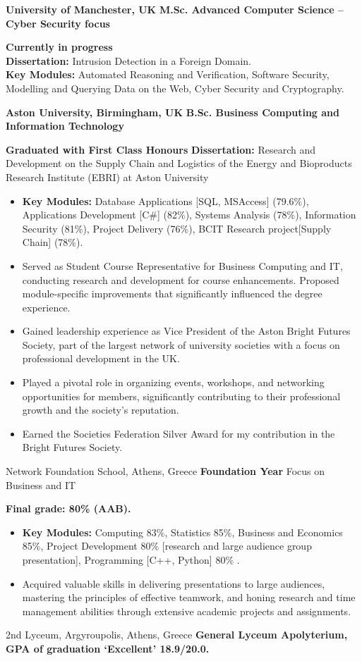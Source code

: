 {\textbf{University of Manchester, UK}}
{\textbf{M.Sc. Advanced Computer Science -- Cyber Security focus}}
{
    \textbf{Currently in progress}
    \\\textbf{Dissertation:} Intrusion Detection in a Foreign Domain.
    \\\textbf{Key Modules:} Automated Reasoning and Verification, Software Security, Modelling and Querying Data on the Web, Cyber Security and Cryptography.

}

{\textbf{Aston University, Birmingham, UK}}
{\textbf{B.Sc. Business Computing and Information Technology}}
{
    \textbf{Graduated with First Class Honours }
    \textbf{Dissertation:} Research and Development on the Supply Chain and Logistics of the Energy and Bioproducts Research Institute (EBRI) at Aston University
    \begin{itemize}
        \item \textbf{Key Modules:} Database Applications [SQL, MSAccess] (79.6\%), Applications Development [C\#] (82\%), Systems Analysis (78\%), Information Security (81\%), Project Delivery (76\%), BCIT Research project[Supply Chain]  (78\%).
        \item Served as Student Course Representative for Business Computing and IT, conducting research and
        development for course enhancements. Proposed module-specific improvements that significantly
        influenced the degree experience.
        \item Gained leadership experience as Vice President of the Aston Bright Futures Society, part of the largest network of university societies with a focus on professional development in the UK.
        \item Played a pivotal role in organizing events, workshops, and networking opportunities for members, significantly contributing to their professional growth and the society's reputation.
        \item Earned the Societies Federation Silver Award for my contribution in the Bright Futures Society.
    \end{itemize}
}

{Network Foundation School, Athens, Greece}
{\textbf{Foundation Year} Focus on Business and IT}
{
    \textbf{Final grade: 80\% (AAB).}
    \begin{itemize}
        \item \textbf{Key Modules:} Computing 83\%, Statistics 85\%, Business and Economics 85\%, Project Development 80\% [research and large audience group presentation], Programming [C++, Python] 80\% .
        \item Acquired valuable skills in delivering presentations to large audiences, mastering the principles of effective teamwork, and honing research and time management abilities through extensive academic projects and assignments.
    \end{itemize}
}

{}
{2nd Lyceum, Argyroupolis, Athens, Greece}
{\textbf{General Lyceum Apolyterium, GPA of graduation ‘Excellent’ 18.9/20.0.}}
